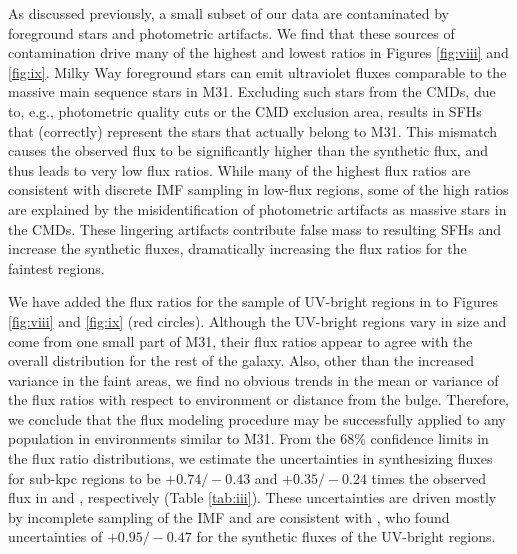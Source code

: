 \documentclass[iop, tighten]{emulateapj}
\begin{document}
As discussed previously, a small subset of our data are contaminated by
foreground stars and photometric artifacts. We find that these sources of
contamination drive many of the highest and lowest ratios in Figures
\ref{fig:viii} and \ref{fig:ix}. Milky Way foreground stars can emit ultraviolet
fluxes comparable to the massive main sequence stars in M31. Excluding such
stars from the CMDs, due to, e.g., photometric quality cuts or the CMD exclusion
area, results in SFHs that (correctly) represent the stars that actually belong
to M31. This mismatch causes the observed flux to be significantly higher than
the synthetic flux, and thus leads to very low flux ratios. While many of the
highest flux ratios are consistent with discrete IMF sampling in low-flux
regions, some of the high ratios are explained by the misidentification of
photometric artifacts as massive stars in the CMDs. These lingering artifacts
contribute false mass to resulting SFHs and increase the synthetic fluxes,
dramatically increasing the flux ratios for the faintest regions.

%
%

We have added the flux ratios for the sample of UV-bright regions in
\citet{Simones:2014} to Figures \ref{fig:viii} and \ref{fig:ix} (red circles).
Although the UV-bright regions vary in size and come from one small part of M31,
their flux ratios appear to agree with the overall distribution for the rest of
the galaxy. Also, other than the increased variance in the faint areas, we find
no obvious trends in the mean or variance of the flux ratios with respect to
environment or distance from the bulge. Therefore, we conclude that the flux
modeling procedure may be successfully applied to any population in environments
similar to M31. From the 68\% confidence limits in the flux ratio distributions,
we estimate the uncertainties in synthesizing fluxes for sub-kpc regions to be
$+\!0.74/\!-\!0.43$ and $+\!0.35/\!-\!0.24$ times the observed flux in \fuv{}
and \nuv{}, respectively (Table \ref{tab:iii}). These uncertainties are driven
mostly by incomplete sampling of the IMF and are consistent with
\citet{Simones:2014}, who found uncertainties of $+\!0.95/\!-\!0.47$ for the
synthetic \fuv{} fluxes of the UV-bright regions.
\end{document}
